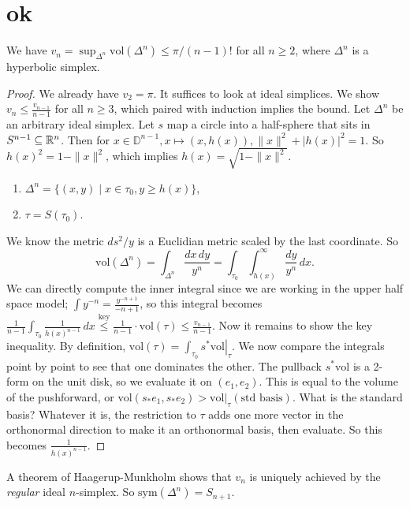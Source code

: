 \section{ok} 
\begin{lemma}
    We have $v_n =\sup _{\Delta ^n }\mathrm{vol}(\Delta ^n ) \leq \pi / (n-1)!$ for all $n\geq 2$, where $\Delta ^n $ is a hyperbolic simplex.
\end{lemma}
\begin{proof}
    We already have $v_2=\pi$. It suffices to look at ideal simplices. We show $v_n  \leq \frac{v_{n-1}}{n-1}$ for all $n\geq 3$, which paired with induction implies the bound. Let $\Delta ^n $ be an arbitrary ideal simplex. Let $s$ map a circle into a half-sphere that sits in $S^{n-1}\subseteq  \mathbb{R}^n $. Then for $x \in \mathbb D^{n-1}, x \mapsto (x,h(x)), \|x\|^2+|h(x)|^2=1.$ So $h(x)^2=1- \|x\|^2$, which implies $h(x) = \sqrt{1- \|x\|^2} $. 
    \begin{enumerate}[label=(\arabic*)]
    \setlength\itemsep{-.2em}
\item $\Delta ^n =\{(x,y) \mid x \in \tau_0, y \geq h(x)\} $,
\item $\tau= S(\tau_0)$.
    \end{enumerate}
    We know the metric $ds ^2 /y$ is a Euclidian metric scaled by the last coordinate. So \[
        \mathrm{vol}(\Delta ^n )= \int _{\Delta ^n } \frac{dx \, dy}{y^n }=\int _{\tau_0}\int_{h(x)}^{\infty} \frac{dy}{y^n } \, dx.
    \] We can directly compute the inner integral since we are working in the upper half space model; $\int y^{-n}=\frac{y^{-n+1}}{-n+1}$, so this integral becomes $\frac{1}{n-1}\int_{\tau_0}\frac{1}{h(x)^{n-1}}\,dx \overset{\text{key} }{\leq}  \frac{1}{n-1}\cdot \mathrm{vol}(\tau) \leq \frac{v_{n-1}}{n-1}$. Now it remains to show the key inequality.
    By definition, $\mathrm{vol}(\tau)= \int _{\tau_0}\left. s^* \mathrm{vol} \right| _{\tau}$. We now compare the integrals point by point to see that one dominates the other. The pullback $s^* \mathrm{vol}$ is a 2-form on the unit disk, so we evaluate it on $(e_1,e_2)$. This is equal to the volume of the pushforward, or $\mathrm{vol}(s_* e_1, s_* e_2)> \left. \mathrm{vol} \right| _{\tau}(\text{std basis} )$. What is the standard basis? Whatever it is, the restriction to $\tau$ adds one more vector in the orthonormal direction to make it an orthonormal basis, then evaluate. So this becomes $\frac{1}{h(x)^{n-1}}$. 
\end{proof}
\begin{remark}
    A theorem of Haagerup-Munkholm shows that $v_n $ is uniquely achieved by the \emph{regular} ideal $n$-simplex. So $\mathrm{sym}(\Delta ^n )=S_{n+1}$.
\end{remark}
